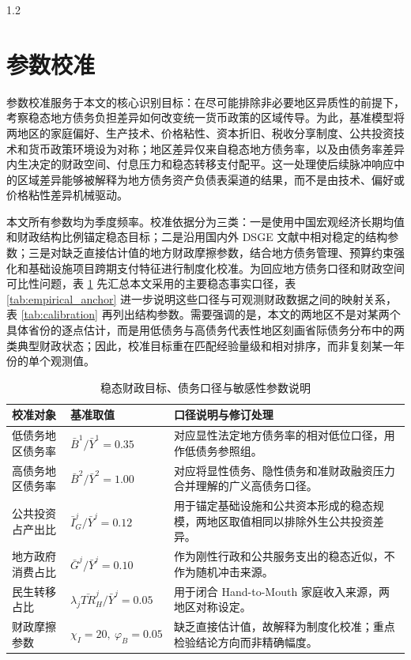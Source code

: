 \documentclass[12pt,UTF8]{ctexart}
\begin{document}
\begin{spacing}{1.2}
		\section{参数校准}
		
		参数校准服务于本文的核心识别目标：在尽可能排除非必要地区异质性的前提下，考察稳态地方债务负担差异如何改变统一货币政策的区域传导。为此，基准模型将两地区的家庭偏好、生产技术、价格粘性、资本折旧、税收分享制度、公共投资技术和货币政策环境设为对称；地区差异仅来自稳态地方债务率，以及由债务率差异内生决定的财政空间、付息压力和稳态转移支付配平。这一处理使后续脉冲响应中的区域差异能够被解释为地方债务资产负债表渠道的结果，而不是由技术、偏好或价格粘性差异机械驱动。
		
		本文所有参数均为季度频率。校准依据分为三类：一是使用中国宏观经济长期均值和财政结构比例锚定稳态目标；二是沿用国内外 DSGE 文献中相对稳定的结构参数；三是对缺乏直接估计值的地方财政摩擦参数，结合地方债务管理、预算约束强化和基础设施项目跨期支付特征进行制度化校准。为回应地方债务口径和财政空间可比性问题，表 \ref{tab:fiscal_targets} 先汇总本文采用的主要稳态事实口径，表 \ref{tab:empirical_anchor} 进一步说明这些口径与可观测财政数据之间的映射关系，表 \ref{tab:calibration} 再列出结构参数。需要强调的是，本文的两地区不是对某两个具体省份的逐点估计，而是用低债务与高债务代表性地区刻画省际债务分布中的两类典型财政状态；因此，校准目标重在匹配经验量级和相对排序，而非复刻某一年份的单个观测值。

		\begin{table}[H]
			\centering
			\caption{稳态财政目标、债务口径与敏感性参数说明}
			\label{tab:fiscal_targets}
			\small
			\begin{tabular}{p{}p{}p{}}
				\toprule
				\textbf{校准对象} & \textbf{基准取值} & \textbf{口径说明与修订处理} \\
				\midrule
				低债务地区债务率 & $\bar B^1/\bar Y^1=0.35$ & 对应显性法定地方债务率的相对低位口径，用作低债务参照组。 \\
				高债务地区债务率 & $\bar B^2/\bar Y^2=1.00$ & 对应将显性债务、隐性债务和准财政融资压力合并理解的广义高债务口径。 \\
				公共投资占产出比 & $\bar I_G^j/\bar Y^j=0.12$ & 用于锚定基础设施和公共资本形成的稳态规模，两地区取值相同以排除外生公共投资差异。 \\
				地方政府消费占比 & $\bar G^j/\bar Y^j=0.10$ & 作为刚性行政和公共服务支出的稳态近似，不作为随机冲击来源。 \\
				民生转移占比 & $\lambda_j\bar{TR}_H^j/\bar Y^j=0.05$ & 用于闭合 Hand-to-Mouth 家庭收入来源，两地区对称设定。 \\
				财政摩擦参数 & $\chi_I=20,\ \varphi_B=0.05$ & 缺乏直接估计值，故解释为制度化校准；重点检验结论方向而非精确幅度。 \\
				\bottomrule
			\end{tabular}
		\end{table}


\end{spacing}
\end{document}
